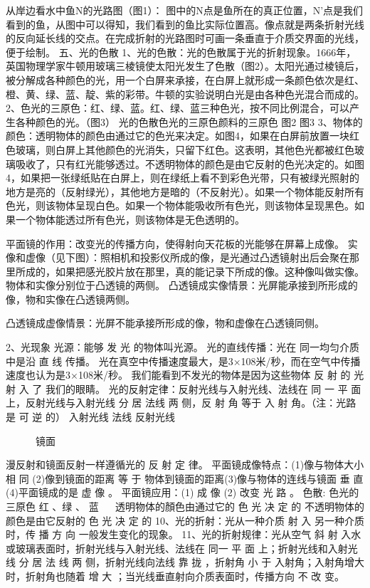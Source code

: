 \documentclass[12pt]{exam}
\begin{document}
从岸边看水中鱼N的光路图（图1）： 图中的N点是鱼所在的真正位置，N'点是我们看到的鱼，从图中可以得知，我们看到的鱼比实际位置高。像点就是两条折射光线的反向延长线的交点。在完成折射的光路图时可画一条垂直于介质交界面的光线，便于绘制。
五、光的色散
1、光的色散：光的色散属于光的折射现象。1666年，英国物理学家牛顿用玻璃三棱镜使太阳光发生了色散（图2）。太阳光通过棱镜后，被分解成各种颜色的光，用一个白屏来承接，在白屏上就形成一条颜色依次是红、橙、黄、绿、蓝、靛、紫的彩带。牛顿的实验说明白光是由各种色光混合而成的。
2、色光的三原色：红、绿、蓝。红、绿、蓝三种色光，按不同比例混合，可以产生各种颜色的光。（图3）
光的色散色光的三原色颜料的三原色
图2                                 图3
3、物体的颜色：透明物体的颜色由通过它的色光来决定。如图4，如果在白屏前放置一块红色玻璃，则白屏上其他颜色的光消失，只留下红色。这表明，其他色光都被红色玻璃吸收了，只有红光能够透过。不透明物体的颜色是由它反射的色光决定的。如图4，如果把一张绿纸贴在白屏上，则在绿纸上看不到彩色光带，只有被绿光照射的地方是亮的（反射绿光），其他地方是暗的（不反射光）。如果一个物体能反射所有色光，则该物体呈现白色。如果一个物体能吸收所有色光，则该物体呈现黑色。如果一个物体能透过所有色光，则该物体是无色透明的。



平面镜的作用：改变光的传播方向，使得射向天花板的光能够在屏幕上成像。	
实像和虚像（见下图）：照相机和投影仪所成的像，是光通过凸透镜射出后会聚在那里所成的，如果把感光胶片放在那里，真的能记录下所成的像。这种像叫做实像。物体和实像分别位于凸透镜的两侧。
凸透镜成实像情景：光屏能承接到所形成的像，物和实像在凸透镜两侧。

凸透镜成虚像情景：光屏不能承接所形成的像，物和虚像在凸透镜同侧。




2、光现象
光源：能够 发 光 的物体叫光源。
光的直线传播：光在 同一均匀介质 中是沿 直 线 传播。
光在真空中传播速度最大，是3×108米/秒，而在空气中传播速度也认为是3×108米/秒。
我们能看到不发光的物体是因为这些物体 反 射 的 光 射 入 了 我们的眼睛。
光的反射定律：反射光线与入射光线、法线在 同 一 平 面 上，反射光线与入射光线 分 居 法线 两 侧，反 射 角 等于 入 射 角。（注：光路是 可 逆 的）
        入射光线                    法线                反射光线

         
　　　镜面

漫反射和镜面反射一样遵循光的 反 射 定 律。
平面镜成像特点：(1)像与物体大小 相 同 (2)像到镜面的距离 等 于 物体到镜面的距离(3)像与物体的连线与镜面 垂 直 (4)平面镜成的是 虚 像 。
平面镜应用：(1)  成 像      (2)  改变   光  路 。
色散: 色光的三原色 红 、绿 、 蓝    
　 透明物体的顏色由通过它的 色 光 决 定 的
   不透明物体的颜色是由它反射的 色 光 决 定 的
10、光的折射：光从一种介质 射 入 另一种介质时，传 播 方 向 一般发生变化的现象。
11、光的折射规律：光从空气 斜 射 入水或玻璃表面时，折射光线与入射光线、法线在 同一 平 面 上；折射光线和入射光线 分 居 法 线 两 侧，折射光线向法线 靠 拢 ，折射角 小 于 入射角；入射角增大时，折射角也随着 增 大 ；当光线垂直射向介质表面时，传播方向 不 改 变。
\end{document}
